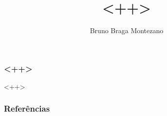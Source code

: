 \documentclass{beamer}
\title{<++>}
\author{Bruno Braga Montezano}
\institute{<++>}
\begin{document}
\begin{frame}

\maketitle

\end{frame}

\begin{frame}
\frametitle{<++>}

<++>

\end{frame}

\begin{frame}
\frametitle{Referências}

\printbibliography

\end{frame}
\end{document}
